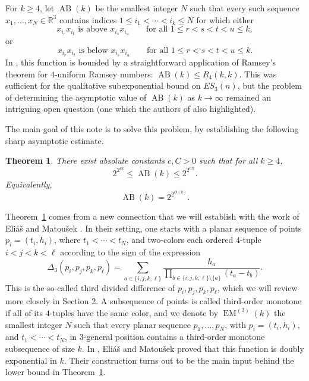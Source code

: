 \documentclass[11pt]{article}
\newtheorem{theorem}{Theorem}
\newcommand{\AB}{\operatorname{AB}}
\begin{document}
For $k\ge 4$, let $\AB(k)$ be the smallest integer $N$ such that every such sequence $x_1,\dots,x_N\in\mathbb R^3$ contains indices $1\le i_1<\cdots<i_k\le N$ for which either
\[
x_{i_r}x_{i_t}\text{ is above }x_{i_s}x_{i_u}
\qquad\text{for all }1\le r<s<t<u\le k,
\]
or
\[
x_{i_r}x_{i_t}\text{ is below }x_{i_s}x_{i_u}
\qquad\text{for all }1\le r<s<t<u\le k.
\]
In \cite{PZ}, this function is bounded by a straightforward application of Ramsey's theorem for $4$-uniform Ramsey numbers: $\AB(k)\le R_4(k,k)$. This was sufficient for the qualitative subexponential bound on $ES_3(n)$, but the problem of determining the asymptotic value of $\AB(k)$ as $k \to \infty$ remained an intriguing open question (one which the authors of \cite{PZ} also highlighted).

The main goal of this note is to solve this problem, by establishing the following sharp asymptotic estimate. 

\begin{theorem}\label{thm:main}
There exist absolute constants $c,C>0$ such that for all $k\ge 4$,
\[
2^{2^{ck}}\le \AB(k)\le 2^{2^{Ck}}.
\]
Equivalently,
\[
\AB(k)=2^{2^{\Theta(k)}}.
\]
\end{theorem}

Theorem~\ref{thm:main} comes from a new connection that we will establish with the work of Eli\'a\v{s} and Matou\v{s}ek \cite{EM}. In their setting, one starts with a planar sequence of points $p_i=(t_i,h_i)$, where $t_1<\cdots<t_N$, and two-colors each ordered $4$-tuple $i<j<k<\ell$ according to the sign of the expression
\begin{equation}\label{eq:third-divdiff-intro}
\Delta_3(p_i,p_j,p_k,p_\ell)
=
\sum_{a\in\{i,j,k,\ell\}} \frac{h_a}{\prod_{b\in\{i,j,k,\ell\}\setminus\{a\}}(t_a-t_b)}.
\end{equation}
This is the so-called third divided difference of $p_i,p_j,p_k,p_{\ell}$, which we will review more closely in Section 2. A subsequence of points is called third-order monotone if all of its $4$-tuples have the same color, and we denote by $\operatorname{EM}^{(3)}(k)$ the smallest integer $N$ such that every planar sequence $p_1,\dots,p_N$, with $p_i=(t_i,h_i)$, and $t_1<\cdots<t_N$, in $3$-general position contains a third-order monotone subsequence of size $k$. In \cite{EM}, Eli\'a\v{s} and Matou\v{s}ek proved that this function is doubly exponential in $k$. Their construction turns out to be the main input behind the lower bound in Theorem~\ref{thm:main}.
\end{document}
